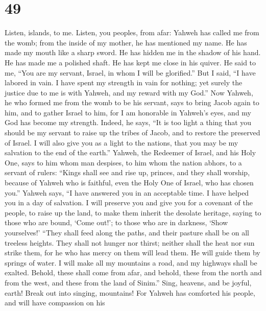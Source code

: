 \hypertarget{section-46}{%
\section{49}\label{section-46}}

 Listen, islands, to me. Listen, you peoples, from afar:
Yahweh has called me from the womb; from the inside of my mother, he has
mentioned my name.  He has made my mouth like a sharp
sword. He has hidden me in the shadow of his hand. He has made me a
polished shaft. He has kept me close in his quiver.  He
said to me, ``You are my servant, Israel, in whom I will be glorified.''
 But I said, ``I have labored in vain. I have spent my
strength in vain for nothing; yet surely the justice due to me is with
Yahweh, and my reward with my God.''  Now Yahweh, he who
formed me from the womb to be his servant, says to bring Jacob again to
him, and to gather Israel to him, for I am honorable in Yahweh's eyes,
and my God has become my strength.  Indeed, he says, ``It
is too light a thing that you should be my servant to raise up the
tribes of Jacob, and to restore the preserved of Israel. I will also
give you as a light to the nations, that you may be my salvation to the
end of the earth.''  Yahweh, the Redeemer of Israel, and
his Holy One, says to him whom man despises, to him whom the nation
abhors, to a servant of rulers: ``Kings shall see and rise up, princes,
and they shall worship, because of Yahweh who is faithful, even the Holy
One of Israel, who has chosen you.''  Yahweh says, ``I
have answered you in an acceptable time. I have helped you in a day of
salvation. I will preserve you and give you for a covenant of the
people, to raise up the land, to make them inherit the desolate
heritage,  saying to those who are bound, `Come out!'; to
those who are in darkness, `Show yourselves!' ``They shall feed along
the paths, and their pasture shall be on all treeless heights.
 They shall not hunger nor thirst; neither shall the heat
nor sun strike them, for he who has mercy on them will lead them. He
will guide them by springs of water.  I will make all my
mountains a road, and my highways shall be exalted. 
Behold, these shall come from afar, and behold, these from the north and
from the west, and these from the land of Sinim.''  Sing,
heavens, and be joyful, earth! Break out into singing, mountains! For
Yahweh has comforted his people, and will have compassion on his
